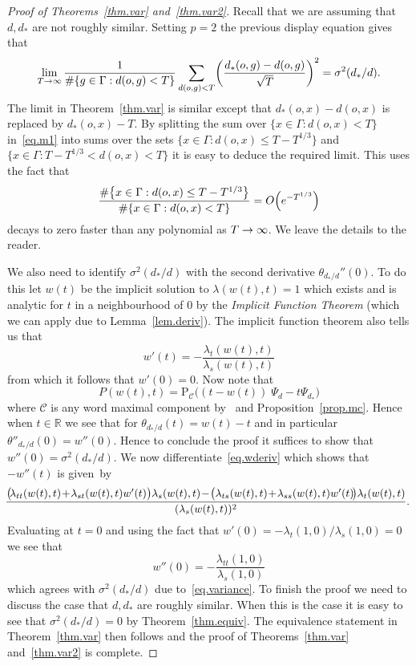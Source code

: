 \documentclass[10pt]{amsart}
\theoremstyle{definition}\newtheorem{defi}[theo]{Definition}\newtheorem{rema}[theo]{Remark}\newtheorem{exam}[theo]{Example}\newtheorem{exem}[theo]{Example}\newtheorem{nota}[theo]{Notation}
\newcommand{\G}{\Gamma}
\renewcommand{\P}{\Psi}
\newcommand{\Cc}{\mathcal{C}}
\newcommand{\R}{\mathbb{R}}
\newcommand*\rmP{\mathrm{P}}
\let\originalleft\left
\let\originalright\right
\renewcommand{\left}{\mathopen{}\mathclose\bgroup\originalleft}
\renewcommand{\right}{\aftergroup\egroup\originalright}
\renewcommand*{\to}{\mathchoice{\longrightarrow}{\rightarrow}{\rightarrow}{\rightarrow}}
\newcounter{setofcase}
\newcounter{case}[setofcase]
\theoremstyle{plain}
\begin{document}
\begin{proof}[Proof of Theorems~\ref{thm.var} and~\ref{thm.var2}]
Recall that we are assuming that $d,d_\ast$ are not roughly similar. Setting $p=2$ the previous display equation gives that
\begin{equation}\label{eq.m1}
\lim_{T\to\infty} \frac{1}{\#\left\{ g\in\G: d(o,g) < T\right\}} \sum_{d(o,g) < T} \left(\frac{d_\ast(o,g) - d(o,g)}{\sqrt{T}} \right)^2 = \sigma^2(d_\ast/d).
\end{equation}
The limit in Theorem~\ref{thm.var} is similar except that $d_\ast(o,x) - d(o,x)$ is replaced by $d_\ast(o,x) - T$. By splitting the sum over $\{ x \in\G: d(o,x) <T\}$ in~\eqref{eq.m1} into sums over the sets $\{ x\in\G: d(o,x) \le T-T^{1/3}\}$ and $\{ x\in\G: T-T^{1/3} < d(o,x) < T\}$ it is easy to deduce the required limit. This uses the fact that
\[
\frac{\#\left\{ x\in\G: d(o,x) \le T-T^{1/3}\right\}}{\#\{x \in \G : d(o,x) < T\}} = O\left(e^{-T^{1/3}}\right)
\]
decays to zero faster than any polynomial as $T\to\infty$. We leave the details to the reader.

We also need to identify $\sigma^2(d_\ast/d)$ with the second derivative $\theta_{d_\ast/d}''(0)$. To do this let $w(t)$ be the implicit solution to $\lambda(w(t),t) = 1$ which exists and is analytic for $t$ in a neighbourhood of $0$ by the \emph{Implicit Function Theorem} (which we can apply due to Lemma~\ref{lem.deriv}). The {implicit function theorem} also tells us that
\begin{equation}\label{eq.wderiv}
w'(t) = - \frac{\lambda_t(w(t), t)}{\lambda_s(w(t),t)}
\end{equation}
from which it follows that $w'(0) = 0$. Now note that
\[
P(w(t), t) = \rmP_\Cc\bigl((t-w(t))\; \P_d - t\P_{d_\ast}\bigr)
\]
where $\Cc$ is any word maximal component by~\cite[Theorem~5.4]{cantrell.tanaka.2} and Proposition~\ref{prop.mc}. Hence when $t \in \R$ we see that for $\theta_{d_\ast/d}(t) = w(t) - t$ and in particular $\theta''_{d_\ast/d}(0) = w''(0)$. Hence to conclude the proof it suffices to show that $w''(0) = \sigma^2(d_\ast/d)$. We now differentiate~\eqref{eq.wderiv} which shows that $ - w''(t)$ is given~by
\[
\mkern-5mu
\frac{
\bigl(\!\lambda_{t t}(w(t), t)\! +\! \lambda_{s t}(w(t),t)w'(t)\bigr) \lambda_s(w(t),t)\!-\! \bigl(\lambda_{t s}(w(t), t)\! +\!\lambda_{s s}(w(t), t) w'(t)\!\bigr) \lambda_t(w(t),t)
}{(\lambda_s(w(t),t))^2}.
\]
Evaluating at $t = 0$ and using the fact that $w'(0) = -\lambda_t(1,0)/\lambda_s(1,0) = 0 $ we see that
\[
w''(0) = - \frac{\lambda_{t t}(1,0)}{\lambda_s(1,0)}
\]
which agrees with $\sigma^2(d_\ast/d)$ due to~\eqref{eq.variance}. To finish the proof we need to discuss the case that $d,d_\ast$ are roughly similar. When this is the case it is easy to see that $\sigma^2(d_\ast/d) = 0$ by Theorem~\ref{thm.equiv}. The equivalence statement in Theorem~\ref{thm.var} then follows and the proof of Theorems~\ref{thm.var} and~\ref{thm.var2} is complete.
\end{proof}
\end{document}
